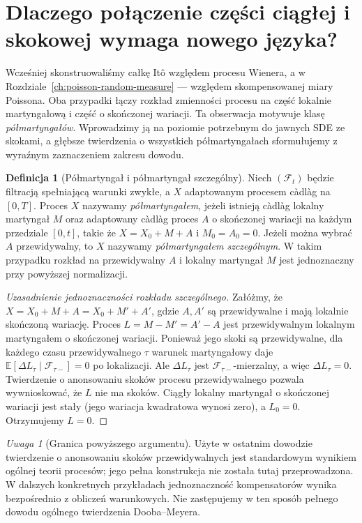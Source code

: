\documentclass[11pt,a4paper,oneside]{report}
\numberwithin{equation}{chapter}
\theoremstyle{plain}
\theoremstyle{definition}
\newtheorem{definicja}{Definicja}[chapter]
\theoremstyle{remark}
\newtheorem{uwaga}{Uwaga}[chapter]
\newcommand{\E}{\mathbb{E}}
\newcommand{\calF}{\mathcal{F}}
\begin{document}
\section{Dlaczego połączenie części ciągłej i skokowej wymaga nowego języka?}\label{sec:volIII:12:01}

Wcześniej skonstruowaliśmy całkę Itô względem procesu Wienera,
a w Rozdziale~\ref{ch:poisson-random-measure} --- względem
skompensowanej miary Poissona. Oba przypadki łączy rozkład
zmienności procesu na część lokalnie martyngałową i część o
skończonej wariacji. Ta obserwacja motywuje klasę
\emph{półmartyngałów}. Wprowadzimy ją na poziomie potrzebnym do
jawnych SDE ze skokami, a głębsze twierdzenia o wszystkich
półmartyngałach sformułujemy z wyraźnym zaznaczeniem zakresu dowodu.

\begin{definicja}[Półmartyngał i półmartyngał szczególny]\label{def:volIII:12:01}
\label{def:semimartingale}
Niech $(\calF_t)$ będzie filtracją spełniającą warunki zwykłe,
a $X$ adaptowanym procesem càdlàg na $[0,T]$.
Proces $X$ nazywamy \emph{półmartyngałem}, jeżeli istnieją
càdlàg lokalny martyngał $M$ oraz adaptowany càdlàg proces
$A$ o skończonej wariacji na każdym przedziale $[0,t]$,
takie że $X=X_0+M+A$ i $M_0=A_0=0$.
Jeżeli można wybrać $A$ przewidywalny, to $X$ nazywamy
\emph{półmartyngałem szczególnym}. W takim przypadku
rozkład na przewidywalny $A$ i lokalny martyngał $M$
jest jednoznaczny przy powyższej normalizacji.
\end{definicja}

\begin{proof}[Uzasadnienie jednoznaczności rozkładu szczególnego]
Załóżmy, że $X=X_0+M+A=X_0+M'+A'$, gdzie $A,A'$ są
przewidywalne i mają lokalnie skończoną wariację.
Proces $L=M-M'=A'-A$ jest przewidywalnym lokalnym
martyngałem o skończonej wariacji. Ponieważ jego skoki są
przewidywalne, dla każdego czasu przewidywalnego $\tau$
warunek martyngałowy daje
$\E[\Delta L_\tau\mid\calF_{\tau-}]=0$ po lokalizacji.
Ale $\Delta L_\tau$ jest $\calF_{\tau-}$-mierzalny,
a więc $\Delta L_\tau=0$. Twierdzenie o anonsowaniu
skoków procesu przewidywalnego pozwala wywnioskować,
że $L$ nie ma skoków. Ciągły lokalny martyngał o
skończonej wariacji jest stały (jego wariacja kwadratowa
wynosi zero), a $L_0=0$. Otrzymujemy $L=0$.
\end{proof}

\begin{uwaga}[Granica powyższego argumentu]
Użyte w ostatnim dowodzie twierdzenie o anonsowaniu skoków
przewidywalnych jest standardowym wynikiem ogólnej teorii
procesów; jego pełna konstrukcja nie została tutaj
przeprowadzona. W dalszych konkretnych przykładach
jednoznaczność kompensatorów wynika bezpośrednio z
obliczeń warunkowych. Nie zastępujemy w ten sposób
pełnego dowodu ogólnego twierdzenia Dooba--Meyera.
\end{uwaga}
\end{document}
